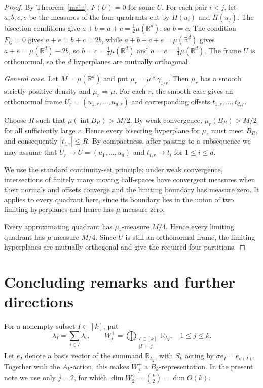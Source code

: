 \documentclass[12pt]{article}
\newcommand{\R}{\mathbb R}
\begin{document}
\begin{proof}
By Theorem~\ref{main}, $F(U)=0$ for some $U$.  For each pair $i<j$,
let $a,b,c,e$ be the measures of the four quadrants cut by $H(u_i)$
and $H(u_j)$.  The bisection conditions give $a+b=a+c=\tfrac12\mu(\R^d)$,
so $b=c$.  The condition $F_{ij}=0$ gives $a+e=b+c=2b$, while
$a+b+c+e=\mu(\R^d)$ gives $a+e=\mu(\R^d)-2b$, so $b=c=\tfrac14\mu(\R^d)$
and $a=e=\tfrac14\mu(\R^d)$.  The frame $U$ is orthonormal, so the
$d$ hyperplanes are mutually orthogonal.

\textit{General case.}
Let $M=\mu(\R^d)$ and put $\mu_r=\mu*\gamma_{1/r}$.
Then $\mu_r$ has a smooth strictly positive density and
$\mu_r\Rightarrow\mu$.  For each $r$, the smooth case gives an
orthonormal frame $U_r=(u_{1,r},\ldots,u_{d,r})$ and corresponding
offsets $t_{1,r},\ldots,t_{d,r}$.

Choose $R$ such that $\mu(\operatorname{int}B_R)>M/2$.  By weak
convergence, $\mu_r(B_R)>M/2$ for all sufficiently large $r$.
Hence every bisecting
hyperplane for $\mu_r$ must meet $B_R$, and consequently
$|t_{i,r}|\le R$.  By compactness, after passing to a subsequence we
may assume that $U_r\to U=(u_1,\ldots,u_d)$ and $t_{i,r}\to t_i$ for
$1\le i\le d$.

We use the standard continuity-set principle: under weak convergence,
intersections of finitely many moving half-spaces have convergent
measures when their normals and offsets converge and the limiting
boundary has measure zero.  It applies to every quadrant here, since its
boundary lies in the union of two limiting hyperplanes and hence has
$\mu$-measure zero.

Every approximating quadrant has $\mu_r$-measure $M/4$.  Hence every
limiting quadrant has $\mu$-measure $M/4$.  Since $U$ is still an
orthonormal frame, the limiting hyperplanes are mutually orthogonal and
give the required four-partitions.
\end{proof}

\section{Concluding remarks and further directions}
For a nonempty subset \(I\subset[k]\), put
\[
 \lambda_I=\sum_{i\in I}\lambda_i, \qquad W_j^+=\bigoplus_{\substack{I\subset[k]\\ |I|=j}}
 \R_{\lambda_I}, \quad 1\le j\le k.
\]
Let \(e_I\) denote a basis vector of the summand
\(\R_{\lambda_I}\), with \(S_k\) acting by
\(\sigma e_I=e_{\sigma(I)}\).
Together with the $A_k$-action, this makes \(W_j^+\) a
\(B_k\)-representation.  In the present note we use only $j=2$,
for which $\dim W_2^+=\binom{k}{2}=\dim O(k)$.
\end{document}

